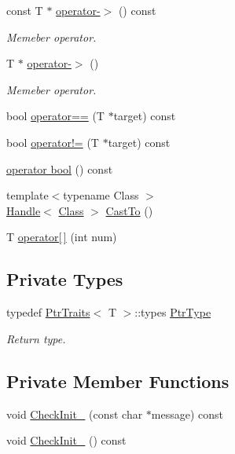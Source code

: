 \begin{DoxyCompactItemize}
const T $\ast$ \hyperlink{classmocha_1_1_handle_aac0744f4944f8a11cf95b1c716fd4331}{operator-\/$>$} () const 
\begin{DoxyCompactList}\small\item\em Memeber operator. \end{DoxyCompactList}\item 
T $\ast$ \hyperlink{classmocha_1_1_handle_a88015a5bd81ae54dc00101bb1c0315bb}{operator-\/$>$} ()
\begin{DoxyCompactList}\small\item\em Memeber operator. \end{DoxyCompactList}\item 
bool \hyperlink{classmocha_1_1_handle_ad2334723661470505174f44cc538703e}{operator==} (T $\ast$target) const 
\item 
bool \hyperlink{classmocha_1_1_handle_a5d92489789f7e263f72f116988fa01cb}{operator!=} (T $\ast$target) const 
\item 
\hyperlink{classmocha_1_1_handle_a5ba0823555ec6bcf30d4a0f6a2c17660}{operator bool} () const 
\item 
{\footnotesize template$<$typename Class $>$ }\\\hyperlink{classmocha_1_1_handle}{Handle}$<$ \hyperlink{classmocha_1_1_class}{Class} $>$ \hyperlink{classmocha_1_1_handle_a1c82610a38aebfe993439109f8b98d9f}{CastTo} ()
\item 
T \hyperlink{classmocha_1_1_handle_a9515324f6fe120df8291a721ddd05cca}{operator\mbox{[}$\,$\mbox{]}} (int num)
\end{DoxyCompactItemize}
\subsection*{Private Types}
\begin{DoxyCompactItemize}
\item 
typedef \hyperlink{structmocha_1_1_ptr_traits}{PtrTraits}$<$ T $>$::types \hyperlink{classmocha_1_1_handle_ab0f5eb08d7783139f6c6c17f2e1098d8}{PtrType}
\begin{DoxyCompactList}\small\item\em Return type. \end{DoxyCompactList}\end{DoxyCompactItemize}
\subsection*{Private Member Functions}
\begin{DoxyCompactItemize}
\item 
void \hyperlink{classmocha_1_1_handle_a9580000fd5a7b1bda7868e7d060bff94}{CheckInit\_\-} (const char $\ast$message) const 
\item 
void \hyperlink{classmocha_1_1_handle_a90b2f483d04cb525a16380a0e301b8cf}{CheckInit\_\-} () const 
\end{DoxyCompactItemize}

